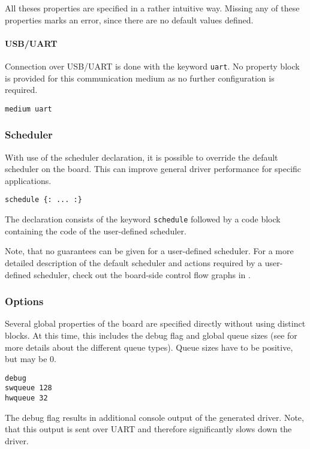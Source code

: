 \documentclass{report}
\begin{document}
All theses properties are specified in a rather intuitive way. Missing any of these properties marks an error, since there are no default values defined.

\paragraph{USB/UART}
Connection over USB/UART is done with the keyword \texttt{uart}. No property block is provided for this communication medium as no further configuration is required.

\begin{lstlisting}[language=bdl]
medium uart
\end{lstlisting}

\subsubsection{Scheduler}
With use of the scheduler declaration, it is possible to override the default scheduler on the board. This can improve general driver performance for specific applications.

\begin{lstlisting}[language=bdl]
schedule {: ... :}
\end{lstlisting}

The declaration consists of the keyword \texttt{schedule} followed by a code block containing the code of the user-defined scheduler.

Note, that no guarantees can be given for a user-defined scheduler. For a more detailed description of the default scheduler and actions required by a user-defined scheduler, check out the board-side control flow graphs in .

\subsubsection{Options}
Several global properties of the board are specified directly without using distinct blocks. At this time, this includes the debug flag and global queue sizes (see  for more details about the different queue types). Queue sizes have to be positive, but may be 0.

\begin{lstlisting}[language=bdl]
debug
swqueue 128
hwqueue 32
\end{lstlisting}

The debug flag results in additional console output of the generated driver. Note, that this output is sent over UART and therefore significantly slows down the driver.
\end{document}
